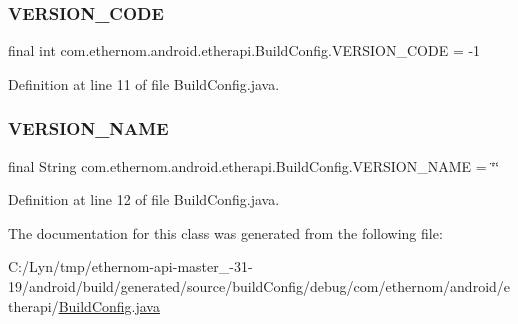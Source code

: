 \subsubsection{\texorpdfstring{V\+E\+R\+S\+I\+O\+N\+\_\+\+C\+O\+DE}{VERSION\_CODE}}
{\footnotesize\ttfamily final int com.\+ethernom.\+android.\+etherapi.\+Build\+Config.\+V\+E\+R\+S\+I\+O\+N\+\_\+\+C\+O\+DE = -\/1\hspace{0.3cm}{\ttfamily [static]}}



Definition at line 11 of file Build\+Config.\+java.

\mbox{\label{classcom_1_1ethernom_1_1android_1_1etherapi_1_1_build_config_aa4fe60e44ff95044227c168f962627d4}} 
\subsubsection{\texorpdfstring{V\+E\+R\+S\+I\+O\+N\+\_\+\+N\+A\+ME}{VERSION\_NAME}}
{\footnotesize\ttfamily final String com.\+ethernom.\+android.\+etherapi.\+Build\+Config.\+V\+E\+R\+S\+I\+O\+N\+\_\+\+N\+A\+ME = \char`\"{}\char`\"{}\hspace{0.3cm}{\ttfamily [static]}}



Definition at line 12 of file Build\+Config.\+java.



The documentation for this class was generated from the following file\+:\begin{DoxyCompactItemize}
\item 
C\+:/\+Lyn/tmp/ethernom-\/api-\/master\+\_-\/31-\/19/android/build/generated/source/build\+Config/debug/com/ethernom/android/etherapi/\mbox{\hyperlink{_build_config_8java}{Build\+Config.\+java}}\end{DoxyCompactItemize}
